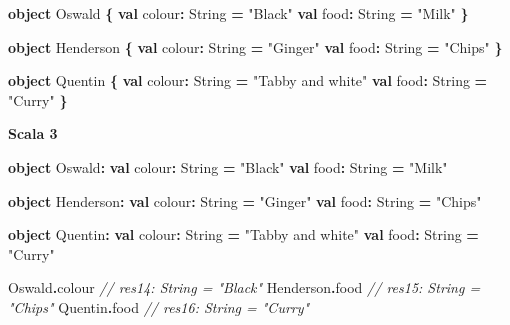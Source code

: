 \documentclass[11pt,a5paper,]{book}
\newenvironment{Shaded}{\begin{snugshade}}{\end{snugshade}}
\newcommand{\CommentTok}[1]{\textcolor[rgb]{0.56,0.35,0.01}{\textit{#1}}}
\newcommand{\ExtensionTok}[1]{#1}
\newcommand{\KeywordTok}[1]{\textcolor[rgb]{0.13,0.29,0.53}{\textbf{#1}}}
\newcommand{\NormalTok}[1]{#1}
\newcommand{\OperatorTok}[1]{\textcolor[rgb]{0.81,0.36,0.00}{\textbf{#1}}}
\newcommand{\StringTok}[1]{\textcolor[rgb]{0.31,0.60,0.02}{#1}}
\begin{document}
\begin{Shaded}
\begin{Highlighting}[]
\KeywordTok{object}\NormalTok{ Oswald }\OperatorTok{\{}
  \KeywordTok{val}\NormalTok{ colour}\OperatorTok{:} \ExtensionTok{String} \OperatorTok{=} \StringTok{"Black"}
  \KeywordTok{val}\NormalTok{ food}\OperatorTok{:} \ExtensionTok{String} \OperatorTok{=} \StringTok{"Milk"}
\OperatorTok{\}}

\KeywordTok{object}\NormalTok{ Henderson }\OperatorTok{\{}
  \KeywordTok{val}\NormalTok{ colour}\OperatorTok{:} \ExtensionTok{String} \OperatorTok{=} \StringTok{"Ginger"}
  \KeywordTok{val}\NormalTok{ food}\OperatorTok{:} \ExtensionTok{String} \OperatorTok{=} \StringTok{"Chips"}
\OperatorTok{\}}

\KeywordTok{object}\NormalTok{ Quentin }\OperatorTok{\{}
  \KeywordTok{val}\NormalTok{ colour}\OperatorTok{:} \ExtensionTok{String} \OperatorTok{=} \StringTok{"Tabby and white"}
  \KeywordTok{val}\NormalTok{ food}\OperatorTok{:} \ExtensionTok{String} \OperatorTok{=} \StringTok{"Curry"}
\OperatorTok{\}}
\end{Highlighting}
\end{Shaded}

\textbf{Scala 3}

\begin{Shaded}
\begin{Highlighting}[]
\KeywordTok{object}\NormalTok{ Oswald}\OperatorTok{:}
  \KeywordTok{val}\NormalTok{ colour}\OperatorTok{:} \ExtensionTok{String} \OperatorTok{=} \StringTok{"Black"}
  \KeywordTok{val}\NormalTok{ food}\OperatorTok{:} \ExtensionTok{String} \OperatorTok{=} \StringTok{"Milk"}

\KeywordTok{object}\NormalTok{ Henderson}\OperatorTok{:}
  \KeywordTok{val}\NormalTok{ colour}\OperatorTok{:} \ExtensionTok{String} \OperatorTok{=} \StringTok{"Ginger"}
  \KeywordTok{val}\NormalTok{ food}\OperatorTok{:} \ExtensionTok{String} \OperatorTok{=} \StringTok{"Chips"}

\KeywordTok{object}\NormalTok{ Quentin}\OperatorTok{:}
  \KeywordTok{val}\NormalTok{ colour}\OperatorTok{:} \ExtensionTok{String} \OperatorTok{=} \StringTok{"Tabby and white"}
  \KeywordTok{val}\NormalTok{ food}\OperatorTok{:} \ExtensionTok{String} \OperatorTok{=} \StringTok{"Curry"}
\end{Highlighting}
\end{Shaded}

\begin{Shaded}
\begin{Highlighting}[]
\NormalTok{Oswald}\OperatorTok{.}\NormalTok{colour}
\CommentTok{// res14: String = "Black"}
\NormalTok{Henderson}\OperatorTok{.}\NormalTok{food}
\CommentTok{// res15: String = "Chips"}
\NormalTok{Quentin}\OperatorTok{.}\NormalTok{food}
\CommentTok{// res16: String = "Curry"}
\end{Highlighting}
\end{Shaded}
\end{document}
